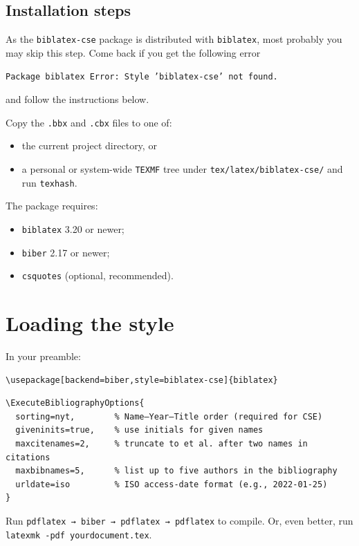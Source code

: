 \documentclass[11pt]{article}
\begin{document}
\subsection{Installation steps}
As the \texttt{biblatex-cse} package is distributed with \texttt{biblatex}, most probably you may skip this step.  Come back if you get the following error
\begin{center}
\texttt{Package biblatex Error: Style 'biblatex-cse' not found.}
\end{center}
\noindent and follow the instructions below.

Copy the \texttt{.bbx} and \texttt{.cbx} files to one of:
\begin{itemize}[nosep]
  \item the current project directory, or
  \item a personal or system-wide \texttt{TEXMF} tree under \texttt{tex/latex/biblatex-cse/} and run \texttt{texhash}.
\end{itemize}

The package requires:
\begin{itemize}
  \item \texttt{biblatex} 3.20 or newer;
  \item \texttt{biber} 2.17 or newer;
  \item \texttt{csquotes} (optional, recommended).
\end{itemize}

\section{Loading the style}

In your preamble:
\begin{verbatim}
\usepackage[backend=biber,style=biblatex-cse]{biblatex}

\end{verbatim}

\begin{verbatim}
\ExecuteBibliographyOptions{
  sorting=nyt,        % Name–Year–Title order (required for CSE)
  giveninits=true,    % use initials for given names
  maxcitenames=2,     % truncate to et al. after two names in citations
  maxbibnames=5,      % list up to five authors in the bibliography
  urldate=iso         % ISO access-date format (e.g., 2022-01-25)
}
\end{verbatim}

Run \texttt{pdflatex → biber → pdflatex → pdflatex} to compile.  Or, even better, run \texttt{latexmk -pdf yourdocument.tex}.
\end{document}
